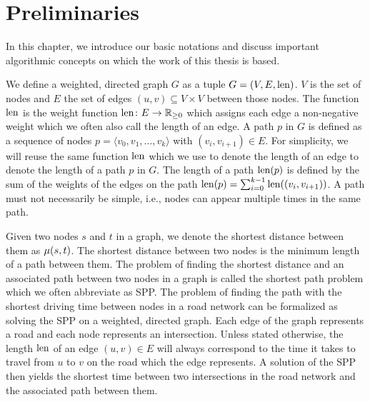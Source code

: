 
\chapter{Preliminaries\label{ch:preliminaries}}
In this chapter, we introduce our basic notations and discuss important algorithmic concepts on which the work of this thesis is based.

We define a weighted, directed graph $G$ as a tuple $G=(V,E,\operatorname{len})$. $V$ is the set of nodes and $E$ the set of edges $(u,v) \subseteq V \times V$ between those nodes. The function $\operatorname{len}$ is the weight function $\operatorname{len}\colon E \rightarrow \mathbb{R}_{\ge 0}$ which assigns each edge a non-negative weight which we often also call the length of an edge. A path $p$ in $G$ is defined as a sequence of nodes $p = \langle v_0,v_1,...,v_k \rangle$ with $(v_i,v_{i+1}) \in E$. For simplicity, we will reuse the same function $\operatorname{len}$ which we use to denote the length of an edge to denote the length of a path $p$ in $G$. The length of a path $\operatorname{len}(p)$ is defined by the sum of the weights of the edges on the path $\operatorname{len}(p) = \sum_{i=0}^{k-1}{\operatorname{len}((v_i,v_{i+1}))}$. A path must not necessarily be simple, i.e., nodes can appear multiple times in the same path.

Given two nodes $s$ and $t$ in a graph, we denote the shortest distance between them as $\mu(s,t)$. The shortest distance between two nodes is the minimum length of a path between them. The problem of finding the shortest distance and an associated path between two nodes in a graph is called the shortest path problem which we often abbreviate as SPP. The problem of finding the path with the shortest driving time between nodes in a road network can be formalized as solving the SPP on a weighted, directed graph. Each edge of the graph represents a road and each node represents an intersection. Unless stated otherwise, the length $\operatorname{len}$ of an edge $(u,v) \in E$ will always correspond to the time it takes to travel from $u$ to $v$ on the road which the edge represents. A solution of the SPP then yields the shortest time between two intersections in the road network and the associated path between them.

